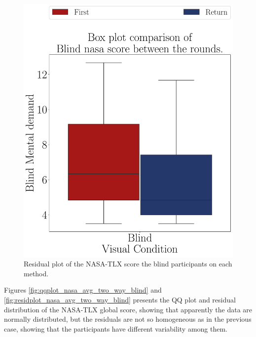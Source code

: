 \begin{figure}[!htb]
\begin{minipage}{0.45\textwidth}
        \includegraphics[width = 0.8\linewidth]{Resultados/Nasa/Figuras/pdf/boxplot_nasa_blind_rounds.pdf}
        \caption{Residual plot of the NASA-TLX score the blind participants on each method.}
        \label{fig:boxplot_nasa_blind_rounds}
    \end{minipage}
\end{figure}

Figures \ref{fig:qqplot_nasa_avg_two_way_blind} and \ref{fig:residplot_nasa_avg_two_way_blind} presents the QQ plot and residual distribution of the NASA-TLX global score, showing that apparently the data are normally distributed, but the residuals are not so homogeneous as in the previous case, showing that the participants have different variability among them.


